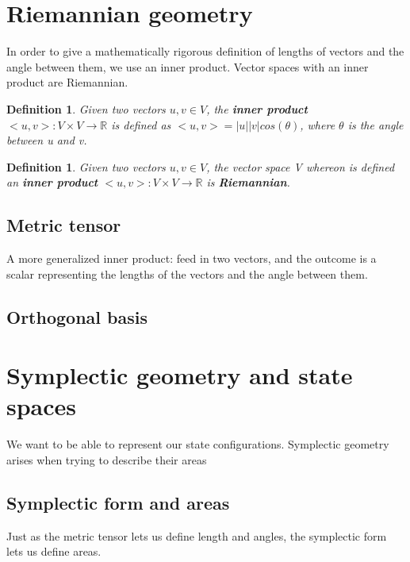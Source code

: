 \documentclass{book}
\newtheorem{defn}[equation]{Definition}
\begin{document}
\section{Riemannian geometry}
In order to give a mathematically rigorous definition of lengths of vectors and the angle between them, we use an inner product. Vector spaces with an inner product are Riemannian.

\begin{defn}
	Given two vectors $u,v \in V$, the \textbf{inner product} $<u,v> : V \times V \to \mathbb{R}$ is defined as $<u,v> = |u||v|cos(\theta)$, where $\theta$ is the angle between u and v. 
\end{defn}
\begin{defn}
	Given two vectors $u,v \in V$, the vector space V whereon is defined an \textbf{inner product} $<u,v> : V \times V \to \mathbb{R}$ is \textbf{Riemannian}.
	\end{defn}


\subsection{Metric tensor}
A more generalized inner product: feed in two vectors, and the outcome is a scalar representing the lengths of the vectors and the angle between them. 
\subsection{Orthogonal basis}

\section{Symplectic geometry and state spaces}
We want to be able to represent our state configurations. Symplectic geometry arises when trying to describe their areas

\subsection{Symplectic form and areas}
Just as the metric tensor lets us define length and angles, the symplectic form lets us define areas. 
\end{document}
